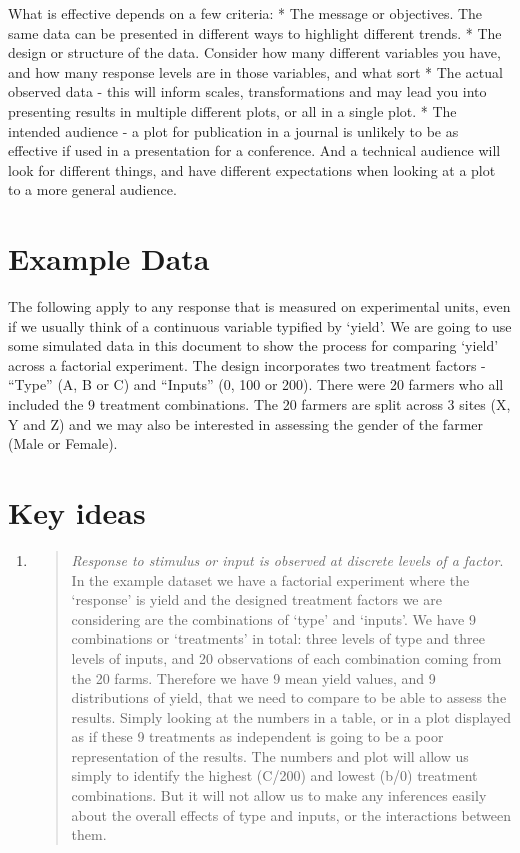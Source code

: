 \documentclass[
]{book}
\begin{document}
What is effective depends on a few criteria:
* The message or objectives. The same data can be presented in different ways to highlight different trends.
* The design or structure of the data. Consider how many different variables you have, and how many response levels are in those variables, and what sort
* The actual observed data - this will inform scales, transformations and may lead you into presenting results in multiple different plots, or all in a single plot.
* The intended audience - a plot for publication in a journal is unlikely to be as effective if used in a presentation for a conference. And a technical audience will look for different things, and have different expectations when looking at a plot to a more general audience.

\hypertarget{example-data}{%
\section{Example Data}\label{example-data}}

The following apply to any response that is measured on experimental units, even if we usually think of a continuous variable typified by `yield'. We are going to use some simulated data in this document to show the process for comparing `yield' across a factorial experiment. The design incorporates two treatment factors - ``Type'' (A, B or C) and ``Inputs'' (0, 100 or 200). There were 20 farmers who all included the 9 treatment combinations. The 20 farmers are split across 3 sites (X, Y and Z) and we may also be interested in assessing the gender of the farmer (Male or Female).

\hypertarget{key-ideas}{%
\section{Key ideas}\label{key-ideas}}

\begin{enumerate}
\def\labelenumi{\arabic{enumi}.}
\item
  \begin{quote}
  \emph{Response to stimulus or input is observed at discrete levels of a factor}. In the example dataset we have a factorial experiment where the `response' is yield and the designed treatment factors we are considering are the combinations of `type' and `inputs'.
  We have 9 combinations or `treatments' in total: three levels of type and three levels of inputs, and 20 observations of each combination coming from the 20 farms. Therefore we have 9 mean yield values, and 9 distributions of yield, that we need to compare to be able to assess the results. Simply looking at the numbers in a table, or in a plot displayed as if these 9 treatments as independent is going to be a poor representation of the results. The numbers and plot will allow us simply to identify the highest (C/200) and lowest (b/0) treatment combinations. But it will not allow us to make any inferences easily about the overall effects of type and inputs, or the interactions between them.
  \end{quote}
\end{enumerate}
\end{document}
